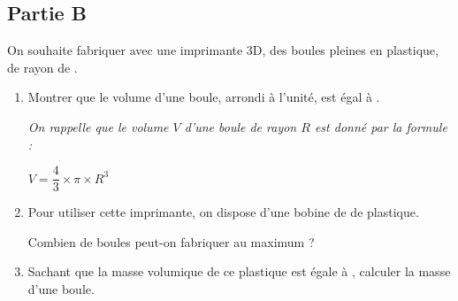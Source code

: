 \subsection*{Partie B}
On souhaite fabriquer avec une imprimante 3D, des boules pleines en plastique, de rayon de .

\begin{enumerate}
	\item Montrer que le volume d'une boule, arrondi à l'unité, est égal à .

	\emph{On rappelle que le volume $V$ d'une boule de rayon $R$ est donné par la formule :}

	$V=\dfrac{4}{3} \times \pi \times R^{3}$

	\item Pour utiliser cette imprimante, on dispose d'une bobine de  de plastique.

	Combien de boules peut-on fabriquer au maximum ?

	\item Sachant que la masse volumique de ce plastique est égale à , calculer la masse d'une boule.
\end{enumerate}

